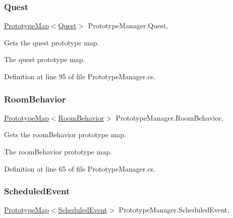 \subsubsection{\texorpdfstring{Quest}{Quest}}
{\footnotesize\ttfamily \hyperlink{class_prototype_map}{Prototype\+Map}$<$\hyperlink{class_quest}{Quest}$>$ Prototype\+Manager.\+Quest\hspace{0.3cm}{\ttfamily [static]}, {\ttfamily [get]}}



Gets the quest prototype map. 

The quest prototype map.

Definition at line 95 of file Prototype\+Manager.\+cs.

\mbox{\label{class_prototype_manager_ae1612252bce28dd967a10a60dd9e8a37}} 
\subsubsection{\texorpdfstring{Room\+Behavior}{RoomBehavior}}
{\footnotesize\ttfamily \hyperlink{class_prototype_map}{Prototype\+Map}$<$\hyperlink{class_project_porcupine_1_1_rooms_1_1_room_behavior}{Room\+Behavior}$>$ Prototype\+Manager.\+Room\+Behavior\hspace{0.3cm}{\ttfamily [static]}, {\ttfamily [get]}}

Gets the room\+Behavior prototype map. 

The room\+Behavior prototype map.

Definition at line 65 of file Prototype\+Manager.\+cs.

\mbox{\label{class_prototype_manager_a8d8abbd54a569dc1729ed5b67e53e204}} 
\subsubsection{\texorpdfstring{Scheduled\+Event}{ScheduledEvent}}
{\footnotesize\ttfamily \hyperlink{class_prototype_map}{Prototype\+Map}$<$\hyperlink{class_scheduler_1_1_scheduled_event}{Scheduled\+Event}$>$ Prototype\+Manager.\+Scheduled\+Event\hspace{0.3cm}{\ttfamily [static]}, {\ttfamily [get]}}



